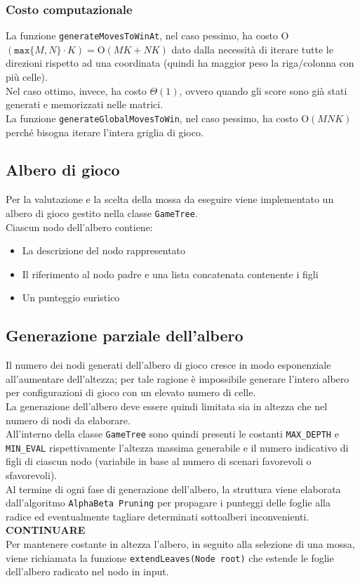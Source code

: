 \documentclass[11pt]{article}
\begin{document}
\subsubsection*{Costo computazionale}
La funzione \texttt{generateMovesToWinAt}, nel caso pessimo, ha costo O$(\texttt{max}\{M, N\} \cdot K) = \text{O}(MK+NK)$ dato dalla necessità di iterare tutte le direzioni rispetto ad una coordinata (quindi ha maggior peso la riga/colonna con più celle).\\
Nel caso ottimo, invece, ha costo $\Theta(1)$, ovvero quando gli score sono già stati generati e memorizzati nelle matrici.\\
La funzione \texttt{generateGlobalMovesToWin}, nel caso pessimo, ha costo O$(MNK)$ perché bisogna iterare l'intera griglia di gioco.\\

\subsection*{Albero di gioco}
Per la valutazione e la scelta della mossa da eseguire viene implementato un albero di gioco gestito nella classe \texttt{GameTree}.\\
Ciascun nodo dell'albero contiene:
\begin{itemize}
\setlength\itemsep{0.05cm}
	\item La descrizione del nodo rappresentato
	\item Il riferimento al nodo padre e una lista concatenata contenente i figli
	\item Un punteggio euristico
\end{itemize}

\subsection*{Generazione parziale dell'albero}
Il numero dei nodi generati dell'albero di gioco cresce in modo esponenziale all'aumentare dell'altezza;
per tale ragione è impossibile generare l'intero albero per configurazioni di gioco con un elevato numero di celle.\\
La generazione dell'albero deve essere quindi limitata sia in altezza che nel numero di nodi da elaborare.\\
All'interno della classe \texttt{GameTree} sono quindi presenti le costanti \texttt{MAX\_DEPTH} e \texttt{MIN\_EVAL} rispettivamente l'altezza massima generabile e il numero indicativo di figli di ciascun nodo (variabile in base al numero di scenari favorevoli o sfavorevoli).\\
Al termine di ogni fase di generazione dell'albero, la struttura viene elaborata dall'algoritmo \texttt{AlphaBeta Pruning} per propagare i punteggi delle foglie alla radice ed eventualmente tagliare determinati sottoalberi inconvenienti.\\
\textbf{CONTINUARE}\\
Per mantenere costante in altezza l'albero, in seguito alla selezione di una mossa, viene richiamata la funzione \texttt{extendLeaves(Node root)} che estende le foglie dell'albero radicato nel nodo in input.
\end{document}
